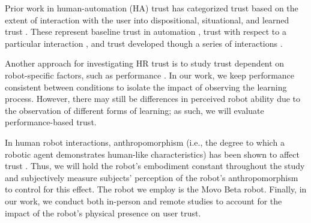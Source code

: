 \documentclass[letterpaper]{article} %
\begin{document}
Prior work in human-automation (HA) trust has categorized trust based on the extent of interaction with the user into dispositional, situational, and learned trust \cite{hoff_trust_2015}. These represent baseline trust in automation \cite{merritt_i_2013}, trust with respect to a particular interaction \cite{jian_foundations_2000}, and trust developed though a series of interactions \cite{de_visser_towards_2020}. 

Another approach for investigating HR trust is to study trust dependent on robot-specific factors, such as performance \cite{hedlund_effects_2021}. In our work, we keep performance consistent between conditions to isolate the impact of observing the learning process. However, there may still be differences in perceived robot ability due to the observation of different forms of learning; as such, we will evaluate performance-based trust. 

In human robot interactions, anthropomorphism (i.e., the degree to which a robotic agent demonstrates human-like characteristics) has been shown to affect trust \cite{3374839}. Thus, we will hold the robot's embodiment constant throughout the study and subjectively measure subjects' perception of the robot's anthropomorphism to control for this effect. The robot we employ is the Movo Beta robot. Finally, in our work, we conduct both in-person and remote studies to account for the impact of the robot's physical presence on user trust. 


\end{document}
